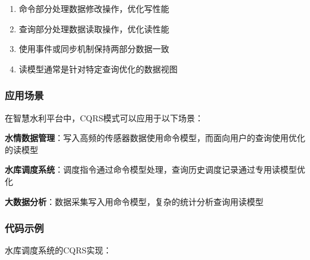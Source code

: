 \begin{enumerate}
\def\labelenumi{\arabic{enumi}.}
\tightlist
\item
  命令部分处理数据修改操作，优化写性能
\item
  查询部分处理数据读取操作，优化读性能
\item
  使用事件或同步机制保持两部分数据一致
\item
  读模型通常是针对特定查询优化的数据视图
\end{enumerate}

\subsubsection{应用场景}\label{ux5e94ux7528ux573aux666f-5}

在智慧水利平台中，CQRS模式可以应用于以下场景：

\textbf{水情数据管理}：写入高频的传感器数据使用命令模型，而面向用户的查询使用优化的读模型

\textbf{水库调度系统}：调度指令通过命令模型处理，查询历史调度记录通过专用读模型优化

\textbf{大数据分析}：数据采集写入用命令模型，复杂的统计分析查询用读模型

\subsubsection{代码示例}\label{ux4ee3ux7801ux793aux4f8b-5}

水库调度系统的CQRS实现：

